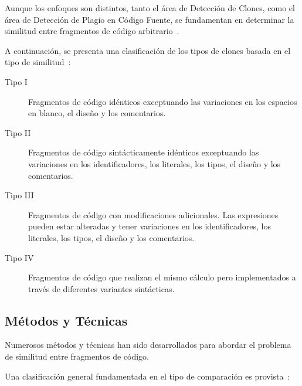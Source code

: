 Aunque los enfoques son distintos,
tanto el área de Detección de Clones,
como el área de Detección de Plagio en Código Fuente,
se fundamentan en determinar la similitud entre fragmentos de código arbitrario~\cite{Beth2014ACO}.

A continuación, se presenta una clasificación de los tipos de clones
basada en el tipo de similitud~\cite{Roy07asurvey}:

\begin{description}
  \item [Tipo I] Fragmentos de código idénticos exceptuando las variaciones en los espacios en blanco, el diseño y los comentarios.
  \item [Tipo II] Fragmentos de código sintácticamente idénticos exceptuando las variaciones en los identificadores, los literales, los tipos, el diseño y los comentarios.
  \item [Tipo III] Fragmentos de código con modificaciones adicionales. Las expresiones pueden estar alteradas y tener variaciones en los identificadores, los literales, los tipos, el diseño y los comentarios.
  \item [Tipo IV] Fragmentos de código que realizan el mismo cálculo pero implementados a través de diferentes variantes sintácticas.
\end{description}

\newpage
\subsection{Métodos y Técnicas}

Numerosos métodos y técnicas han sido desarrollados para abordar
el problema de similitud entre fragmentos de código.

Una clasificación general fundamentada en el tipo de comparación es provista~\cite{Roy07asurvey}:

